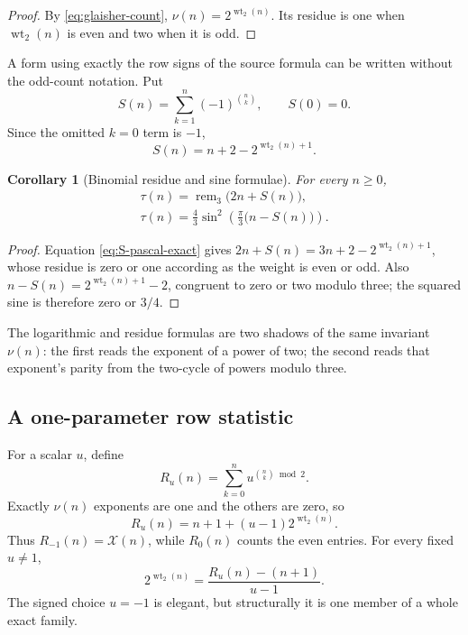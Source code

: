 \documentclass[11pt,oneside]{article}
\numberwithin{equation}{section}
\newtheorem{corollary}[theorem]{Corollary}
\theoremstyle{definition}
\theoremstyle{remark}
\newcommand{\wt}{\operatorname{wt}_2}
\begin{document}
\begin{proof}
By \eqref{eq:glaisher-count}, \(\nu(n)=2^{\wt(n)}\).  Its residue is one when
\(\wt(n)\) is even and two when it is odd.
\end{proof}

A form using exactly the row signs of the source formula can be written without
the odd-count notation.  Put
\begin{equation}
  S(n)=\sum_{k=1}^{n}(-1)^{\binom nk},
  \qquad S(0)=0.
  \label{eq:S-pascal}
\end{equation}
Since the omitted \(k=0\) term is \(-1\),
\begin{equation}
  S(n)=n+2-2^{\wt(n)+1}.
  \label{eq:S-pascal-exact}
\end{equation}

\begin{corollary}[Binomial residue and sine formulae]
\label{cor:mod-three-sine}
For every \(n\ge0\),
\begin{align}
  \boxed{
  \tau(n)=\operatorname{rem}_3\bigl(2n+S(n)\bigr),}
  \label{eq:pascal-mod3}\\
  \boxed{
  \tau(n)=\frac43\sin^2\!\left(
     \frac\pi3\bigl(n-S(n)\bigr)
  \right).}
  \label{eq:pascal-sine}
\end{align}
\end{corollary}

\begin{proof}
Equation \eqref{eq:S-pascal-exact} gives
\(2n+S(n)=3n+2-2^{\wt(n)+1}\), whose residue is zero or one according as the
weight is even or odd.  Also
\(n-S(n)=2^{\wt(n)+1}-2\), congruent to zero or two modulo three; the squared
sine is therefore zero or \(3/4\).
\end{proof}

The logarithmic and residue formulas are two shadows of the same invariant
\(\nu(n)\): the first reads the exponent of a power of two; the second reads
that exponent's parity from the two-cycle of powers modulo three.

\subsection{A one-parameter row statistic}

For a scalar \(u\), define
\begin{equation}
  R_u(n)=\sum_{k=0}^{n}u^{\binom nk\bmod2}.
  \label{eq:Ru-definition}
\end{equation}
Exactly \(\nu(n)\) exponents are one and the others are zero, so
\begin{equation}
  \boxed{
  R_u(n)=n+1+(u-1)2^{\wt(n)}.}
  \label{eq:Ru-exact}
\end{equation}
Thus \(R_{-1}(n)=\mathcal X(n)\), while \(R_0(n)\) counts the even entries.
For every fixed \(u\ne1\),
\begin{equation}
  2^{\wt(n)}=\frac{R_u(n)-(n+1)}{u-1}.
  \label{eq:Ru-recovery}
\end{equation}
The signed choice \(u=-1\) is elegant, but structurally it is one member of a
whole exact family.
\end{document}
